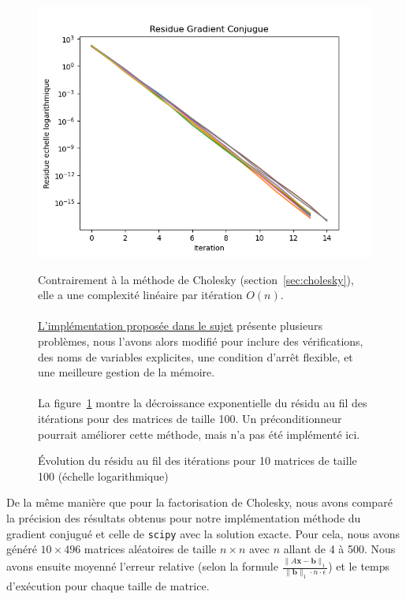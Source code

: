 \documentclass{article}
\begin{document}
\begin{figure}[H]
  \begin{minipage}{0.4\textwidth}
    \includegraphics[width=\textwidth]{img/residue100.png}
    \caption{Évolution du résidu au fil des itérations pour 10 matrices de taille 100 (échelle logarithmique)}
    \label{fig:residue_100}
  \end{minipage}
  \hfill
  \begin{minipage}{0.55\textwidth}
    Contrairement à la méthode de Cholesky (section~\ref{sec:cholesky}), elle a une complexité linéaire par itération \(O(n)\).\\ \\
    \underline{\href{https://cours-mf.gitlabpages.inria.fr/is104/2-linear_systems/2-gc/}{L'implémentation proposée dans le sujet}} présente plusieurs problèmes, nous l'avons alors modifié pour inclure des vérifications, des noms de variables explicites, une condition d'arrêt flexible, et une meilleure gestion de la mémoire.\\ \\
    La figure~\ref{fig:residue_100} montre la décroissance exponentielle du résidu au fil des itérations pour des matrices de taille 100. Un préconditionneur pourrait améliorer cette méthode, mais n'a pas été implémenté ici.
  \end{minipage}
\end{figure}
De la même manière que pour la factorisation de Cholesky, nous avons comparé la précision des résultats obtenus pour notre implémentation méthode du gradient conjugué et celle de \texttt{scipy} avec la solution exacte. Pour cela, nous avons généré \(10 \times 496\) matrices aléatoires de taille \(n \times n\) avec \(n\) allant de 4 à 500. Nous avons ensuite moyenné l'erreur relative (selon la formule \(\frac{\| A \mathbf{x} - \mathbf{b} \|_1}{\| \mathbf{b} \|_1 \cdot n \cdot \epsilon}\)) et le temps d'exécution pour chaque taille de matrice.
\end{document}
